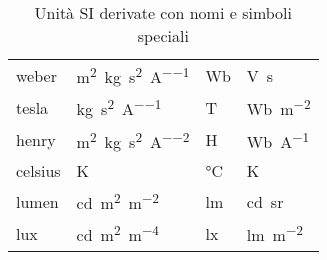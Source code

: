 \begin{table}[ht]
\begin{tabular}{llll}
    weber       & \si{\meter\squared\kilogram\per\second\squared\per\ampere}         & \si{\weber}     & \si{\volt\second}                       \\
    tesla       & \si{\kilogram\per\second\squared\per\ampere}                       & \si{\tesla}     & \si{\weber\per\meter\squared}           \\
    henry       & \si{\meter\squared\kilogram\per\second\squared\per\ampere\squared} & \si{\henry}     & \si{\weber\per\ampere}                  \\
    celsius     & \si{\kelvin}                                                       & \si{\celsius}   & \si{\kelvin}                            \\
    lumen       & \si{\candela\meter\squared\per\meter\squared}                      & \si{\lumen}     & \si{\candela\steradian}                 \\
    lux         & \si{\candela\meter\squared\meter^{-4}}                             & \si{\lux}       & \si{\lumen\per\meter\squared}           \\
    \hline
  \end{tabular}
  \caption{Unità SI derivate con nomi e simboli speciali}
\end{table}

